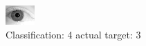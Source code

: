 \begin{figure}[h!]
\begin{center}
\includegraphics[width=0.60\columnwidth]{figures/ID2169_class_4_target_3.png}
\end{center}
\caption{ Classification: 4 actual target: 3}
\label{fig:ID2169_class_4_target_3}
\end{figure}
